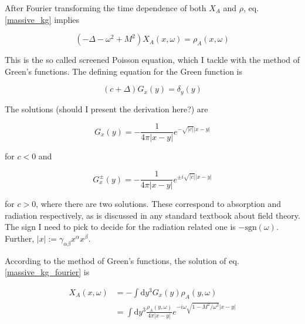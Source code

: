 \documentclass[11pt]{article}
\begin{document}
After Fourier transforming the time dependence of both $X_A$ and $\rho$, eq. \ref{massive_kg} implies

\begin{equation} \label{massive_kg_fourier}
	\left( - \Delta - \omega^2 + M^2  \right) X_A \left( x, \omega \right)
	=
	\rho_A \left(x, \omega \right)
\end{equation}

This is the so called screened Poisson equation, which I tackle with the method of Green's functions. The defining equation for the Green function is 

\begin{equation}
	\left( c + \Delta \right) G_x \left(y  \right) = \delta_y \left( y \right)
\end{equation}

The solutions (should I present the derivation here?) are

\begin{equation}
	G_x \left( y \right) 
	=
	- \frac{1}{4 \pi \left| x - y\right|} 
	e^{- \sqrt{\left| c \right|}\left| x - y\right|}
\end{equation}

for $c < 0$ and

\begin{equation}
	G^\pm_x \left( y \right) 
	=
	- \frac{1}{4 \pi \left| x - y\right|} 
	e^{\pm i \sqrt{\left| c \right|}\left| x - y\right|}
\end{equation}

for $c > 0$, where there are two solutions. These correspond to absorption and radiation respectively, as is discussed in any standard textbook about field theory. The sign I need to pick to decide for the radiation related one is $- \text{sgn} \left( \omega \right)$. Further, $\left|x \right| := \gamma_{\alpha \beta}x^\alpha x^\beta $.

According to the method of Green's functions, the solution of eq. \ref{massive_kg_fourier} is 

\begin{equation} \label{massive_kg_sol}
	\begin{split}
		X_A \left( x, \omega \right) 
		&= 
		- \int \mathrm{d} y^3 G_x \left( y \right) \rho_A \left( y, \omega \right)
		\\ 
		&= 
		\int \mathrm{d} y^3 \frac{ \rho_A \left( y, \omega \right)}
		{4 \pi \left| x - y \right|}
		e^{-i \omega \sqrt{1 - M^2 / \omega^2} \left| x - y \right|}
	\end{split}
\end{equation} 
\end{document}
